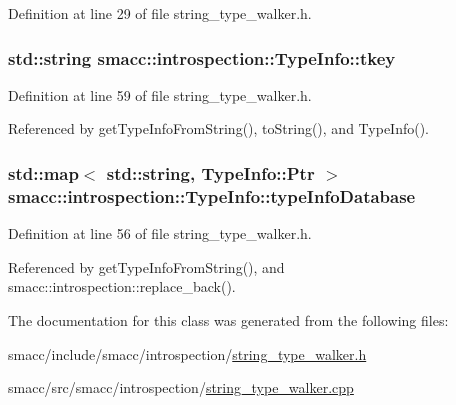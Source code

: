 Definition at line 29 of file string\+\_\+type\+\_\+walker.\+h.

\subsubsection[{\texorpdfstring{tkey}{tkey}}]{\setlength{\rightskip}{0pt plus 5cm}std\+::string smacc\+::introspection\+::\+Type\+Info\+::tkey\hspace{0.3cm}{\ttfamily [private]}}\hypertarget{classsmacc_1_1introspection_1_1TypeInfo_a697dd505119258dba1224d10eea5b2bd}{}\label{classsmacc_1_1introspection_1_1TypeInfo_a697dd505119258dba1224d10eea5b2bd}


Definition at line 59 of file string\+\_\+type\+\_\+walker.\+h.



Referenced by get\+Type\+Info\+From\+String(), to\+String(), and Type\+Info().

\subsubsection[{\texorpdfstring{type\+Info\+Database}{typeInfoDatabase}}]{\setlength{\rightskip}{0pt plus 5cm}std\+::map$<$ std\+::string, {\bf Type\+Info\+::\+Ptr} $>$ smacc\+::introspection\+::\+Type\+Info\+::type\+Info\+Database\hspace{0.3cm}{\ttfamily [static]}}\hypertarget{classsmacc_1_1introspection_1_1TypeInfo_ab780c03206b824aaf338135d16b0eff4}{}\label{classsmacc_1_1introspection_1_1TypeInfo_ab780c03206b824aaf338135d16b0eff4}


Definition at line 56 of file string\+\_\+type\+\_\+walker.\+h.



Referenced by get\+Type\+Info\+From\+String(), and smacc\+::introspection\+::replace\+\_\+back().



The documentation for this class was generated from the following files\+:\begin{DoxyCompactItemize}
\item 
smacc/include/smacc/introspection/\hyperlink{string__type__walker_8h}{string\+\_\+type\+\_\+walker.\+h}\item 
smacc/src/smacc/introspection/\hyperlink{string__type__walker_8cpp}{string\+\_\+type\+\_\+walker.\+cpp}\end{DoxyCompactItemize}

